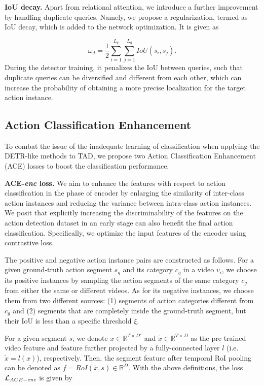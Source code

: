 \documentclass[runningheads]{llncs}
\newcommand{\myPara}[1]{\vspace{.05in}\noindent\textbf{#1}}
\newcommand{\mc}[1]{\mathcal{#1}}
\newcommand{\mb}[1]{\mathbb{#1}}
\begin{document}
\myPara{IoU decay.} 
Apart from relational attention, we introduce a further improvement by handling duplicate queries.
Namely, we propose a regularization, termed as IoU decay, which is added to the network optimization. It is given as   

\begin{equation}
    \omega_d=\frac{1}{2}\sum_{i=1}^{L_q}\sum_{j=1}^{L_q}{IoU(s_i,s_j)}.
\end{equation}
During the detector training, it penalizes the IoU between queries, such that duplicate queries can be diversified and different from each other, which can increase the probability of obtaining a more precise localization for the target action instance.










\subsection{Action Classification Enhancement} \label{cls_section}
To combat the issue of the inadequate learning of classification when applying the DETR-like methods to TAD, we propose two Action Classification Enhancement (ACE) losses to boost the classification performance. 


\textbf{ACE-\emph{enc} loss.} We aim to enhance the features with respect to action classification in the phase of encoder by enlarging the similarity of inter-class action instances and reducing the variance between intra-class action instances. 
We posit that explicitly increasing the discriminability of the features on the action detection dataset in an early stage can also benefit the final action classification.
Specifically, we optimize the input features of the encoder using contrastive loss.

The positive and negative action instance pairs are constructed as follows. For a given ground-truth action segment $s_{g}$ and its category $c_g$ in a video $v_i$, we choose its positive instances by sampling the action segments of the same category $c_g$ from either the same or different videos. As for its negative instances, we choose them from two different sources: (1) segments of action categories different from $c_g$ and (2) segments that are completely inside the ground-truth segment, but their IoU is less than a specific threshold $\xi$. 

For a given segment $s$, we denote $x\in \mb{R}^{T \times D'}$ and $\widetilde{x} \in \mb{R}^{T \times D}$ as the pre-trained video feature and feature further projected by a fully-connected layer $l$ (i.e. $\widetilde{x}=l(x)$), respectively. Then, the segment feature after temporal RoI pooling ~\cite{xu2020g} can be denoted as $f=RoI(\widetilde{x},s) \in \mb{R}^{D}$. With the above definitions, the loss $\mc{L}_{ACE-\emph{enc}}$ is given by   
\end{document}
